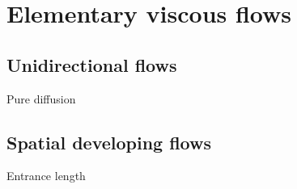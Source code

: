 \documentclass{article}
\begin{document}
    \section{Elementary viscous flows}
    \subsection{Unidirectional flows}
    Pure diffusion
    \subsection{Spatial developing flows}
    Entrance length
\end{document}
